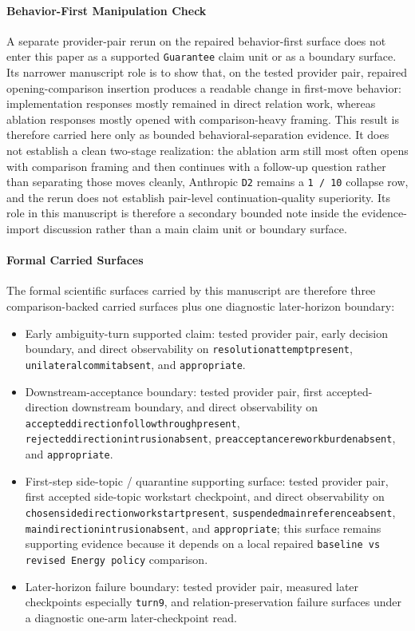 \documentclass[11pt]{article}
\renewcommand{\_}{\textunderscore\hspace{0pt}}
\begin{document}
\paragraph{Behavior-First Manipulation Check}

A separate provider-pair rerun on the repaired behavior-first surface does not
enter this paper as a supported \texttt{Guarantee} claim unit or as a boundary
surface. Its narrower
manuscript role is to show that, on the tested provider pair, repaired
opening-comparison insertion produces a readable change in first-move behavior:
implementation responses mostly remained in direct relation work, whereas
ablation responses mostly opened with comparison-heavy framing. This result is
therefore carried here only as bounded behavioral-separation evidence. It does
not establish a clean two-stage realization: the ablation arm still most often
opens with comparison framing and then continues with a follow-up question
rather than separating those moves cleanly, Anthropic \texttt{D2} remains a
\texttt{1 / 10} collapse row, and the rerun does not establish pair-level
continuation-quality superiority. Its role in this manuscript is therefore a
secondary bounded note inside the evidence-import discussion rather than a main
claim unit or boundary surface.

\paragraph{Formal Carried Surfaces}

The formal scientific surfaces carried by this manuscript are therefore three
comparison-backed carried surfaces plus one diagnostic later-horizon boundary:
\begin{itemize}
\item Early ambiguity-turn supported claim: tested provider pair, early
decision boundary, and direct observability on
\texttt{resolution\_attempt\_present}, \texttt{unilateral\_commit\_absent}, and
\texttt{appropriate}.
\item Downstream-acceptance boundary: tested provider pair, first accepted-
direction downstream boundary, and direct observability on
\texttt{accepted\_direction\_followthrough\_present},
\texttt{rejected\_direction\_intrusion\_absent},
\texttt{preacceptance\_rework\_burden\_absent}, and \texttt{appropriate}.
\item First-step side-topic / quarantine supporting surface: tested provider
pair, first accepted side-topic workstart checkpoint, and direct observability on
\texttt{chosen\_side\_direction\_workstart\_present},
\texttt{suspended\_main\_reference\_absent},
\texttt{main\_direction\_intrusion\_absent}, and \texttt{appropriate}; this
surface remains supporting evidence because it depends on a local repaired
\texttt{baseline vs revised Energy policy} comparison.
\item Later-horizon failure boundary: tested provider pair, measured later
  checkpoints especially \texttt{turn9}, and relation-preservation failure
  surfaces under a diagnostic one-arm later-checkpoint read.
\end{itemize}
\end{document}
